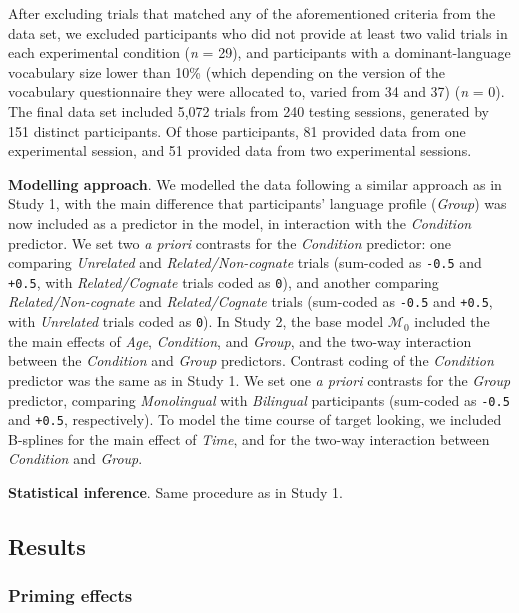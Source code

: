\documentclass[
  12pt,
  b5paperpaper,
  twoside]{scrreprt}
\begin{document}
After excluding trials that matched any of the aforementioned criteria
from the data set, we excluded participants who did not provide at least
two valid trials in each experimental condition (\emph{n} = 29), and
participants with a dominant-language vocabulary size lower than 10\%
(which depending on the version of the vocabulary questionnaire they
were allocated to, varied from 34 and 37) (\emph{n} = 0). The final data
set included 5,072 trials from 240 testing sessions, generated by 151
distinct participants. Of those participants, 81 provided data from one
experimental session, and 51 provided data from two experimental
sessions.

\textbf{Modelling approach}. We modelled the data following a similar
approach as in Study 1, with the main difference that participants'
language profile (\emph{Group}) was now included as a predictor in the
model, in interaction with the \emph{Condition} predictor. We set two
\emph{a priori} contrasts for the \emph{Condition} predictor: one
comparing \emph{Unrelated} and \emph{Related/Non-cognate} trials
(sum-coded as \texttt{-0.5} and \texttt{+0.5}, with
\emph{Related/Cognate} trials coded as \texttt{0}), and another
comparing \emph{Related/Non-cognate} and \emph{Related/Cognate} trials
(sum-coded as \texttt{-0.5} and \texttt{+0.5}, with \emph{Unrelated}
trials coded as \texttt{0}). In Study 2, the base model
\(\mathcal{M}_0\) included the the main effects of \emph{Age},
\emph{Condition}, and \emph{Group}, and the two-way interaction between
the \emph{Condition} and \emph{Group} predictors. Contrast coding of the
\emph{Condition} predictor was the same as in Study 1. We set one
\emph{a priori} contrasts for the \emph{Group} predictor, comparing
\emph{Monolingual} with \emph{Bilingual} participants (sum-coded as
\texttt{-0.5} and \texttt{+0.5}, respectively). To model the time course
of target looking, we included B-splines for the main effect of
\emph{Time}, and for the two-way interaction between \emph{Condition}
and \emph{Group}.

\textbf{Statistical inference}. Same procedure as in Study 1.

\hypertarget{results-1}{%
\subsection{Results}\label{results-1}}

\hypertarget{priming-effects-1}{%
\subsubsection{Priming effects}\label{priming-effects-1}}
\end{document}
